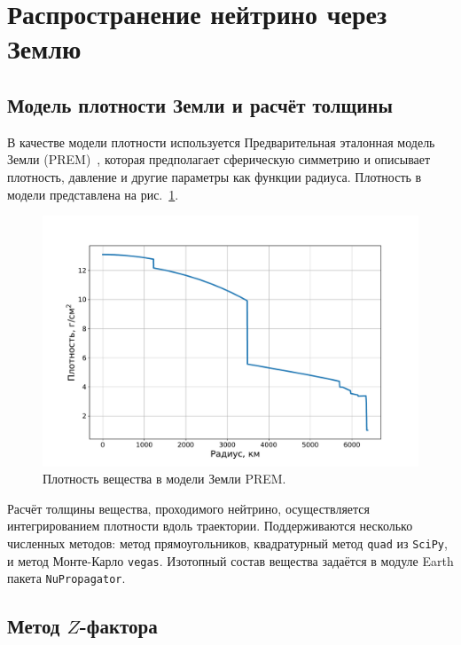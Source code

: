 \section{Распространение нейтрино через Землю}
\subsection{Модель плотности Земли и расчёт толщины}

В качестве модели плотности используется Предварительная эталонная модель Земли (PREM)~\cite{dziewonskiPREM1981}, которая предполагает сферическую симметрию и описывает плотность, давление и другие параметры как функции радиуса. Плотность в модели представлена на рис.~\ref{PREM}.

\begin{figure}[!h]
\centering
\includegraphics[width=\linewidth]{images/NuProp/PREM.pdf}
\caption{Плотность вещества в модели Земли PREM.}
\label{PREM}
\end{figure}

Расчёт толщины вещества, проходимого нейтрино, осуществляется интегрированием плотности вдоль траектории. Поддерживаются несколько численных методов: метод прямоугольников, квадратурный метод \texttt{quad} из \texttt{SciPy}, и метод Монте-Карло \texttt{vegas}. Изотопный состав вещества задаётся в модуле Earth пакета \texttt{NuPropagator}.

\subsection{Метод $Z$-фактора}

